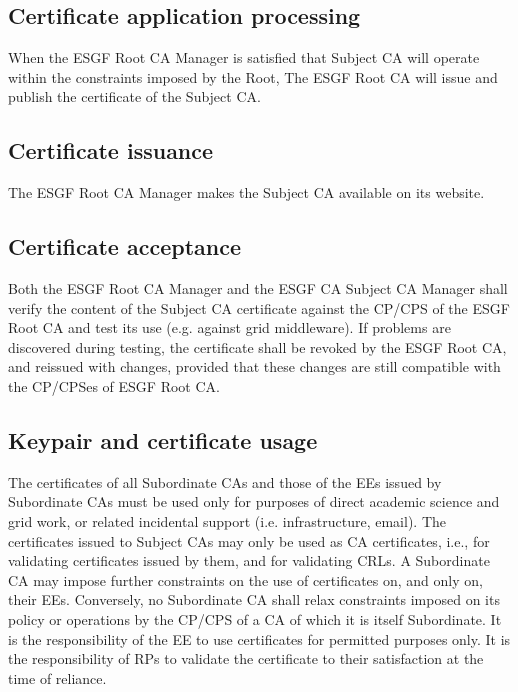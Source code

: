 \subsection{Certificate application processing}\label{certificate-application-processing}

When the ESGF Root CA Manager is satisfied that Subject CA will
operate within the constraints imposed by the Root, The ESGF Root CA
will issue and publish the certificate of the Subject CA.

\subsection{Certificate issuance}\label{certificate-issuance}

The ESGF Root CA Manager makes the Subject CA available on its
website.

\subsection{Certificate acceptance}\label{certificate-acceptance}

Both the ESGF Root CA Manager and the ESGF CA Subject CA Manager
shall verify the content of the Subject CA certificate against the
CP/CPS of the ESGF Root CA and test its use (e.g. against grid
middleware). If problems are discovered during testing, the certificate
shall be revoked by the ESGF Root CA, and reissued with changes,
provided that these changes are still compatible with the CP/CPSes of
ESGF Root CA.

\subsection{Keypair and certificate usage}\label{key-pair-and-certificate-usage}

The certificates of all Subordinate CAs and those of the EEs issued by
Subordinate CAs must be used only for purposes of direct academic
science and grid work, or related incidental support (i.e.
infrastructure, email). The certificates issued to Subject CAs may only
be used as CA certificates, i.e., for validating certificates issued by
them, and for validating CRLs. A Subordinate CA may impose further
constraints on the use of certificates on, and only on, their EEs.
Conversely, no Subordinate CA shall relax constraints imposed on its
policy or operations by the CP/CPS of a CA of which it is itself
Subordinate. It is the responsibility of the EE to use certificates for
permitted purposes only. It is the responsibility of RPs to validate the
certificate to their satisfaction at the time of reliance.

